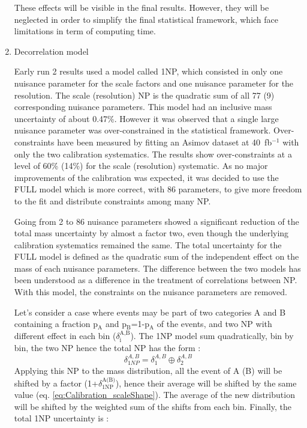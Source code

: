 \begin{enumerate}
These effects will be visible in the final results.
However, they will be neglected in order to simplify the final statistical framework, which face limitations in term of computing time.

\item Decorrelation model
\label{sec:org572f644}
\label{subsec:decorrelation_model}

Early run 2 results used a model called 1NP, which consisted in only one nuisance parameter for the scale factors and one nuisance parameter for the resolution.
The scale (resolution) NP is the quadratic sum of all 77 (9) corresponding nuisance parameters.
This model had an inclusive mass uncertainty of about 0.47\%.
However it was observed that a single large nuisance parameter was over-constrained in the statistical framework.
Over-constraints have been measured by fitting an Asimov dataset at 40~fb$^{-1}$ with only the two calibration systematics.
The results show over-constraints at a level of 60\% (14\%) for the scale (resolution) systematic.
As no major improvements of the calibration was expected, it was decided to use the FULL model which is more correct, with 86 parameters, to give more freedom to the fit and distribute constraints among many NP.

Going from 2 to 86 nuisance parameters showed a significant reduction of the total mass uncertainty by almost a factor two, even though the underlying calibration systematics remained the same.
The total uncertainty for the FULL model is defined as the quadratic sum of the independent effect on the mass of each nuisance parameters.
The difference between the two models has been understood as a difference in the treatment of correlations between NP.
With this model, the constraints on the nuisance parameters are removed.

Let's consider a case where events may be part of two categories A and B containing a fraction p\(_{\text{A}}\) and p\(_{\text{B}}\)=1-p\(_{\text{A}}\) of the events, and two NP with different effect in each bin (\(\delta_{\text{i}}^{\text{A,B}}\)).
The 1NP model sum quadratically, bin by bin, the two NP hence the total NP has the form :
\begin{equation}
\delta_{1NP}^{A,B} = \delta_1^{A,B} \oplus \delta_2^{A,B}
\end{equation}
Applying this NP to the mass distribution, all the event of A (B) will be shifted by a factor (1+\(\delta_{\text{1NP}}^{\text{A(B)}}\)), hence their average will be shifted by the same value (eq. \ref{eq:Calibration_scaleShape}).
The average of the new distribution will be shifted by the weighted sum of the shifts from each bin.
Finally, the total 1NP uncertainty is :


\end{enumerate}
